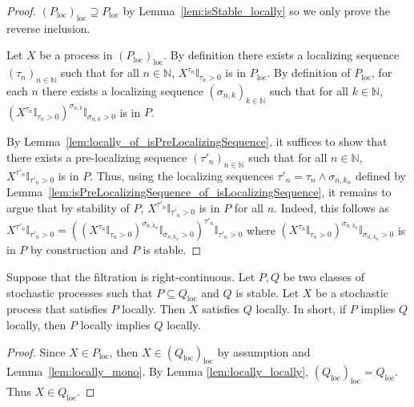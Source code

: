 \begin{proof}\leanok
$(P_{\mathrm{loc}})_{\mathrm{loc}} \supseteq P_{\mathrm{loc}}$ by Lemma~\ref{lem:isStable_locally} so we only prove the reverse inclusion.

Let $X$ be a process in $(P_{\mathrm{loc}})_{\mathrm{loc}}$.
By definition there exists a localizing sequence $(\tau_n)_{n \in \mathbb{N}}$ such that for all $n \in \mathbb{N}$, $X^{\tau_n}\mathbb{I}_{\tau_n > 0}$ is in $P_{\mathrm{loc}}$.
By definition of $P_{\mathrm{loc}}$, for each $n$ there exists a localizing sequence $(\sigma_{n,k})_{k \in \mathbb{N}}$ such that for all $k \in \mathbb{N}$, $(X^{\tau_n}\mathbb{I}_{\tau_n > 0})^{\sigma_{n,k}}\mathbb{I}_{\sigma_{n,k} > 0}$ is in $P$.

By Lemma~\ref{lem:locally_of_isPreLocalizingSequence}, it suffices to show that there exists a pre-localizing sequence $(\tau'_n)_{n \in \mathbb{N}}$ such that for all $n \in \mathbb{N}$, $X^{\tau'_n}\mathbb{I}_{\tau'_n > 0}$ is in $P$.
Thus, using the localizing sequences $\tau'_n = \tau_n \wedge \sigma_{n, k_n}$ defined by Lemma~\ref{lem:isPreLocalizingSequence_of_isLocalizingSequence},
it remains to argue that by stability of $P$, $X^{\tau'_n}\mathbb{I}_{\tau'_n > 0}$ is in $P$ for all $n$.
Indeed, this follows as $X^{\tau'_n}\mathbb{I}_{\tau'_n > 0} = ((X^{\tau_n}\mathbb{I}_{\tau_n > 0})^{\sigma_{n,k_n}}\mathbb{I}_{\sigma_{n,k_n} > 0})^{\tau'_n}\mathbb{I}_{\tau'_n > 0}$ where $(X^{\tau_n}\mathbb{I}_{\tau_n > 0})^{\sigma_{n,k_n}}\mathbb{I}_{\sigma_{n,k_n} > 0}$ is in $P$ by construction and $P$ is stable.
\end{proof}


\begin{lemma}\label{lem:local_induction}
  \leanok
Suppose that the filtration is right-continuous.
Let $P, Q$ be two classes of stochastic processes such that $P \subseteq Q_{\mathrm{loc}}$ and $Q$ is stable.
Let $X$ be a stochastic process that satisfies $P$ locally.
Then $X$ satisfies $Q$ locally.
In short, if $P$ implies $Q$ locally, then $P$ locally implies $Q$ locally.
\end{lemma}

\begin{proof}\leanok
Since $X \in P_{\mathrm{loc}}$, then $X \in (Q_{\mathrm{loc}})_{\mathrm{loc}}$ by assumption and Lemma~\ref{lem:locally_mono}.
By Lemma \ref{lem:locally_locally}, $(Q_{\mathrm{loc}})_{\mathrm{loc}} = Q_{\mathrm{loc}}$.
Thus $X \in Q_{\mathrm{loc}}$.
\end{proof}

